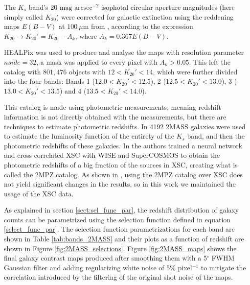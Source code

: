 \documentclass[openany,a4paper,12pt,oneside]{book}
\begin{document}
\begin{spacing}{1.5}
The $K_s$ band's $20 \text{ mag arcsec}^{-2}$ isophotal circular aperture magnitudes (here simply called $K_{20}$) were corrected for galactic extinction using the reddening maps $E(B-V)$ at $\SI{100}{\mu \meter}$ from \cite{Schlegel_1998}, according to the expression $K_{20} \rightarrow K_{20}'=K_{20}-A_k$, where $A_k=0.367E(B-V)$.

HEALPix was used to produce and analyse the maps with resolution parameter $nside=32$, a mask was applied to every pixel with $A_k>0.05$. This left the catalog with $801,476$ objects with $12<K_{20}'<14$, which were further divided into the four bands: Bands 1 ($12.0<K_{20}'<12.5$), 2 ($12.5<K_{20}'<13.0$), 3 ($13.0<K_{20}'<13.5$) and 4 ($13.5<K_{20}'<14.0$). 

This catalog is made using photometric measurements, meaning redshift information is not directly obtained with the measurements, but there are techniques to estimate photometric redshifts. In \cite{K20_lum_func} 4192 2MASS galaxies were used to estimate the luminosity function of the entirety of the $K_s$ band, and then the photometric redshifts of these galaxies. In \cite{2MPZ} the authors trained a neural network and cross-correlated XSC with WISE \cite{WISE} and SuperCOSMOS \cite{SuperCOSMOS} to obtain the photometric redshifts of a big fraction of the sources in XSC, creating what is called the 2MPZ catalog. As shown in \cite{Moura-Santos_2016}, using the 2MPZ catalog over XSC does not yield significant changes in the results, so in this work we maintained the usage of the XSC data.

As explained in section \ref{sect:sel_func_par}, the redshift distribution of galaxy counts can be parametrized using the selection function defined in equation \eqref{select_func_par}. The selection function parametrizations for each band are shown in Table \ref{tab:bands_2MASS} and their plots as a function of redshift are shown in Figure \ref{fig:2MASS_selections}. Figure \ref{fig:2MASS_maps} shows the final galaxy contrast maps produced after smoothing them with a 5$^\circ$ FWHM Gaussian filter and adding regularizing white noise of 5\% pixel$^{-1}$ to mitigate the correlation introduced by the filtering of the original shot noise of the maps.


\end{spacing}
\end{document}
